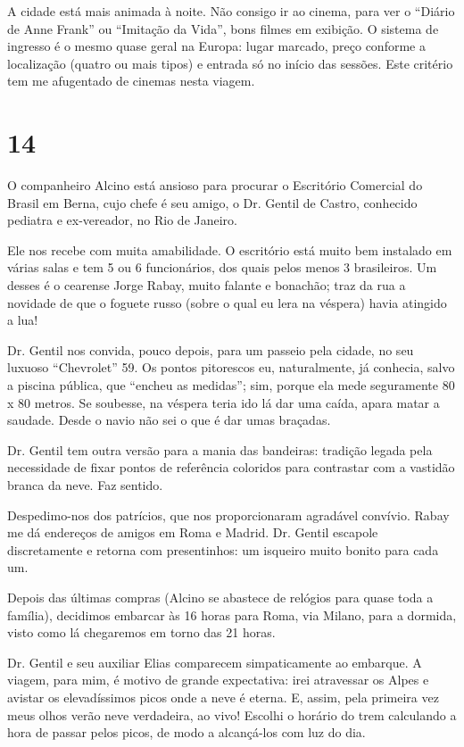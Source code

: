 A cidade está mais animada à noite. Não consigo ir ao cinema, para ver o ``Diário de Anne Frank'' ou ``Imitação da Vida'', bons filmes em exibição. O sistema de ingresso é o mesmo quase geral na Europa: lugar marcado, preço conforme a localização (quatro ou mais tipos) e entrada só no início das sessões. Este critério tem me afugentado de cinemas nesta viagem.

\section*{14 \adfflatleafright {}}
O companheiro Alcino está ansioso para procurar o Escritório Comercial do Brasil em Berna, cujo chefe é seu amigo, o Dr. Gentil de Castro, conhecido pediatra e ex-vereador, no Rio de Janeiro.

Ele nos recebe com muita amabilidade. O escritório está muito bem instalado em várias salas e tem 5 ou 6 funcionários, dos quais pelos menos 3 brasileiros. Um desses é o cearense Jorge Rabay, muito falante e bonachão; traz da rua a novidade de que o foguete russo (sobre o qual eu lera na véspera) havia atingido a lua!

Dr. Gentil nos convida, pouco depois, para um passeio pela cidade, no seu luxuoso ``Chevrolet'' 59. Os pontos pitorescos eu, naturalmente, já conhecia, salvo a piscina pública, que ``encheu as medidas''; sim, porque ela mede seguramente 80 x 80 metros. Se soubesse, na véspera teria ido lá dar uma caída, apara matar a saudade. Desde o navio não sei o que é dar umas braçadas.

Dr. Gentil tem outra versão para a mania das bandeiras: tradição legada pela necessidade de fixar pontos de referência coloridos para contrastar com a vastidão branca da neve. Faz sentido.

Despedimo-nos dos patrícios, que nos proporcionaram agradável convívio. Rabay me dá endereços de amigos em Roma e Madrid. Dr. Gentil escapole discretamente e retorna com presentinhos: um isqueiro muito bonito para cada um.

Depois das últimas compras (Alcino se abastece de relógios para quase toda a família), decidimos embarcar às 16 horas para Roma, via Milano, para a dormida, visto como lá chegaremos em torno das 21 horas.

Dr. Gentil e seu auxiliar Elias comparecem simpaticamente ao embarque. A viagem, para mim, é motivo de grande expectativa: irei atravessar os Alpes e avistar os elevadíssimos picos onde a neve é eterna. E, assim, pela primeira vez meus olhos verão neve verdadeira, ao vivo! Escolhi o horário do trem calculando a hora de passar pelos picos, de modo a alcançá-los com luz do dia.

